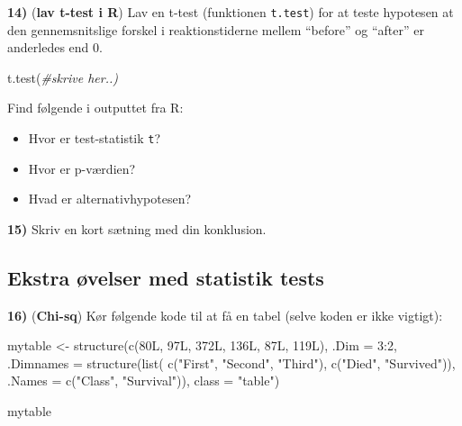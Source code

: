 \documentclass[
]{book}
\newenvironment{Shaded}{\begin{snugshade}}{\end{snugshade}}
\newcommand{\AttributeTok}[1]{\textcolor[rgb]{0.77,0.63,0.00}{#1}}
\newcommand{\CommentTok}[1]{\textcolor[rgb]{0.56,0.35,0.01}{\textit{#1}}}
\newcommand{\DecValTok}[1]{\textcolor[rgb]{0.00,0.00,0.81}{#1}}
\newcommand{\FunctionTok}[1]{\textcolor[rgb]{0.00,0.00,0.00}{#1}}
\newcommand{\NormalTok}[1]{#1}
\newcommand{\OtherTok}[1]{\textcolor[rgb]{0.56,0.35,0.01}{#1}}
\newcommand{\SpecialCharTok}[1]{\textcolor[rgb]{0.00,0.00,0.00}{#1}}
\newcommand{\StringTok}[1]{\textcolor[rgb]{0.31,0.60,0.02}{#1}}
\providecommand{\tightlist}{%
  \setlength{\itemsep}{0pt}\setlength{\parskip}{0pt}}
\begin{document}
\textbf{14)} (\textbf{lav t-test i R}) Lav en t-test (funktionen \texttt{t.test}) for at teste hypotesen at den gennemsnitslige forskel i reaktionstiderne mellem ``before'' og ``after'' er anderledes end 0.

\begin{Shaded}
\begin{Highlighting}[]
\FunctionTok{t.test}\NormalTok{(}\CommentTok{\#skrive her..)}
\end{Highlighting}
\end{Shaded}

Find følgende i outputtet fra R:

\begin{itemize}
\tightlist
\item
  Hvor er test-statistik \texttt{t}?
\item
  Hvor er p-værdien?
\item
  Hvad er alternativhypotesen?
\end{itemize}

\textbf{15)} Skriv en kort sætning med din konklusion.

\hypertarget{ekstra-uxf8velser-med-statistik-tests}{%
\subsection{Ekstra øvelser med statistik tests}\label{ekstra-uxf8velser-med-statistik-tests}}

\textbf{16)} (\textbf{Chi-sq}) Kør følgende kode til at få en tabel (selve koden er ikke vigtigt):

\begin{Shaded}
\begin{Highlighting}[]
\NormalTok{mytable }\OtherTok{\textless{}{-}} \FunctionTok{structure}\NormalTok{(}\FunctionTok{c}\NormalTok{(80L, 97L, 372L, 136L, 87L, 119L), }\AttributeTok{.Dim =} \DecValTok{3}\SpecialCharTok{:}\DecValTok{2}\NormalTok{, }\AttributeTok{.Dimnames =} \FunctionTok{structure}\NormalTok{(}\FunctionTok{list}\NormalTok{(}
    \FunctionTok{c}\NormalTok{(}\StringTok{"First"}\NormalTok{, }\StringTok{"Second"}\NormalTok{, }\StringTok{"Third"}\NormalTok{), }\FunctionTok{c}\NormalTok{(}\StringTok{"Died"}\NormalTok{, }\StringTok{"Survived"}\NormalTok{)), }\AttributeTok{.Names =} \FunctionTok{c}\NormalTok{(}\StringTok{"Class"}\NormalTok{, }\StringTok{"Survival"}\NormalTok{)), }\AttributeTok{class =} \StringTok{"table"}\NormalTok{)}

\NormalTok{mytable}
\end{Highlighting}
\end{Shaded}
\end{document}
